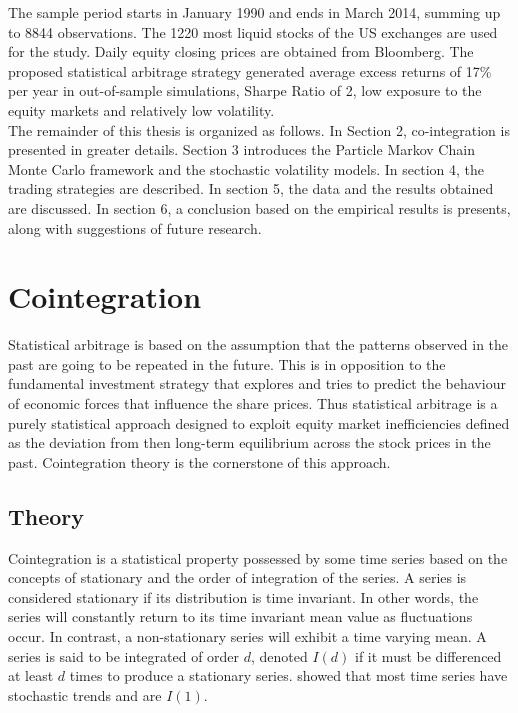 \documentclass[11pt,a4,twosided,singlespacing,titlepagenumber=on]{scrreprt}
\numberwithin{equation}{chapter} %
\theoremstyle{remark}
\begin{document}
\noindent
The sample period starts in January 1990 and ends in March 2014, summing up to 8844 observations. The 1220 most liquid stocks of the US exchanges are used for the study. Daily equity closing prices are obtained from Bloomberg. The proposed statistical arbitrage strategy generated average excess returns of 17\% per year in out-of-sample simulations, Sharpe Ratio of 2, low exposure to the equity markets and relatively low volatility. \\

\noindent
The remainder of this thesis is organized as follows. In Section 2, co-integration is presented in greater details. Section 3 introduces the Particle Markov Chain Monte Carlo framework and the stochastic volatility models. In section 4, the trading strategies are described. In section 5, the data and the results obtained are discussed. In section 6, a conclusion based on the empirical results is presents, along with suggestions of future research.

\chapter{Cointegration}

Statistical arbitrage is based on the assumption that the patterns observed in the past are going to be repeated in the future. This is in opposition to the fundamental investment strategy that explores and tries to predict the behaviour of economic forces that influence the share prices. Thus statistical arbitrage is a purely statistical approach designed to exploit equity market inefficiencies defined as the deviation from then long-term equilibrium across the stock prices in the past. Cointegration theory is the cornerstone of this approach. 

\section{Theory}
Cointegration is a statistical property possessed by some time series based on the concepts of stationary and the order of integration of the series. A series is considered stationary if its distribution is time invariant. In other words, the series will constantly return to its time invariant mean value as fluctuations occur. In contrast, a non-stationary series will exhibit a time varying mean. A series is said to be integrated of order $d$, denoted $I(d)$ if it must be differenced at least $d$ times to produce a stationary series.
\cite{nelson1982} showed that most time series have stochastic trends and are $I(1)$. \\
\end{document}

